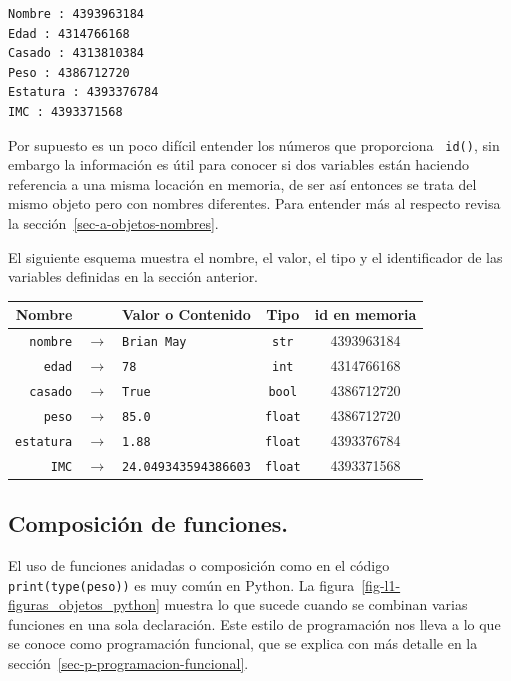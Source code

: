 \documentclass[
  spanish,
  letterpaper,
]{scrbook}
\theoremstyle{definition}
\theoremstyle{remark}
\begin{document}
\begin{verbatim}
Nombre : 4393963184
Edad : 4314766168
Casado : 4313810384
Peso : 4386712720
Estatura : 4393376784
IMC : 4393371568
\end{verbatim}

Por supuesto es un poco difícil entender los números que proporciona
\texttt{~id()}, sin embargo la información es útil para conocer si dos
variables están haciendo referencia a una misma locación en memoria, de
ser así entonces se trata del mismo objeto pero con nombres diferentes.
Para entender más al respecto revisa la
sección~\ref{sec-a-objetos-nombres}.

El siguiente esquema muestra el nombre, el valor, el tipo y el
identificador de las variables definidas en la sección anterior.

\begin{longtable}[]{@{}rllcc@{}}
\toprule\noalign{}
Nombre & & Valor o Contenido & Tipo & id en memoria \\
\midrule\noalign{}
\endhead
\bottomrule\noalign{}
\endlastfoot
\texttt{nombre} & \(\rightarrow\) & \texttt{Brian\ May} & \texttt{str} &
4393963184 \\
\texttt{edad} & \(\rightarrow\) & \texttt{78} & \texttt{int} &
4314766168 \\
\texttt{casado} & \(\rightarrow\) & \texttt{True} & \texttt{bool} &
4386712720 \\
\texttt{peso} & \(\rightarrow\) & \texttt{85.0} & \texttt{float} &
4386712720 \\
\texttt{estatura} & \(\rightarrow\) & \texttt{1.88} & \texttt{float} &
4393376784 \\
\texttt{IMC} & \(\rightarrow\) & \texttt{24.049343594386603} &
\texttt{float} & 4393371568 \\
\end{longtable}

\subsection{Composición de
funciones.}\label{sec-l1-composicion-de-funciones}

El uso de funciones anidadas o composición como en el código
\texttt{print(type(peso))} es muy común en Python. La
figura~\ref{fig-l1-figuras_objetos_python} muestra lo que sucede cuando
se combinan varias funciones en una sola declaración. Este estilo de
programación nos lleva a lo que se conoce como programación funcional,
que se explica con más detalle en la
sección~\ref{sec-p-programacion-funcional}.
\end{document}
